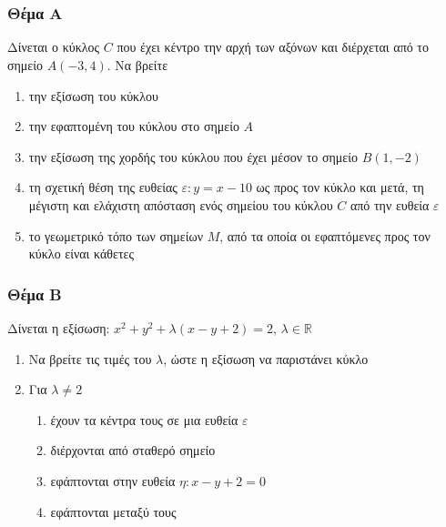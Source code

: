 \documentclass[12pt]{article}
\begin{document}
\part*{}

\section*{Θέμα Α}
Δίνεται ο κύκλος $C$ που έχει κέντρο την αρχή των αξόνων και διέρχεται από το σημείο $Α(-3,4)$. Να βρείτε
\begin{enumerate}
  \item την εξίσωση του κύκλου
  \item την εφαπτομένη του κύκλου στο σημείο $Α$
  \item την εξίσωση της χορδής του κύκλου που έχει μέσον το σημείο $Β(1,-2)$
  \item τη σχετική θέση της ευθείας $ε:y=x-10$ ως προς τον κύκλο και μετά, τη μέγιστη και ελάχιστη απόσταση ενός σημείου του κύκλου $C$ από την ευθεία $ε$
  \item το γεωμετρικό τόπο των σημείων $Μ$, από τα οποία οι εφαπτόμενες προς τον κύκλο είναι κάθετες
\end{enumerate}

\section*{Θέμα Β}
Δίνεται η εξίσωση: $x^2+y^2+λ(x-y+2)=2$, $λ\in\mathbb{R}$
\begin{enumerate}
  \item Να βρείτε τις τιμές του $λ$, ώστε η εξίσωση να παριστάνει κύκλο
  \item Για $λ\ne 2$
        \begin{enumerate}
          \item έχουν τα κέντρα τους σε μια ευθεία $ε$
          \item διέρχονται από σταθερό σημείο
          \item εφάπτονται στην ευθεία $η: x-y+2=0$
          \item εφάπτονται μεταξύ τους
        \end{enumerate}
\end{enumerate}
\end{document}
